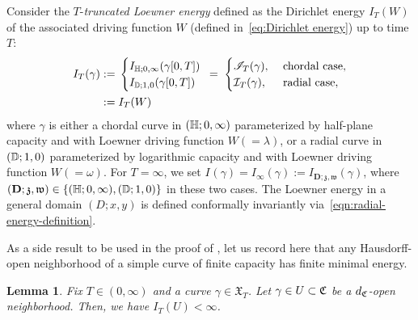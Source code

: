 \documentclass[a4paper, 11pt]{article}
\newtheorem{lem}[thm]{Lemma}
\theoremstyle{definition}
\numberwithin{equation}{section}
\numberwithin{figure}{section}
\newcommand{\BMenergy}[1][]{I_{#1}}%
\newcommand{\renergy}[1][]{{\mathcal I}_{#1}}
\newcommand{\cenergy}[1][]{{\mathscr I}_{#1}}
\newcommand{\lenergy}[2]{I_{#1;#2}}
\newcommand{\Xlenergy}[1][]{I_{#1}}
\newcommand{\Xpaths}[1][]{\mathfrak{X}_{#1}}
\newcommand{\dCcompsets}{d_{\Ccompsets}}
\newcommand{\Ddomain}{\mathbf{D}}
\newcommand{\targetpoint}{\mathfrak{w}}
\newcommand{\beginpoint}{\mathfrak{z}}
\begin{document}
Consider the $T$-\emph{truncated Loewner energy}  
defined as the Dirichlet energy $\BMenergy[T](W)$ of the associated driving function $W$
(defined in~\eqref{eq:Dirichlet energy}) up to time $T$: 
\begin{align}\label{eqn:truncated-energy-definition}
\begin{split}
\Xlenergy[T](\gamma) 
:= \; & 
\begin{cases}
\lenergy{\bH}{0, \infty}(\gamma[0,T]) \\
\lenergy{\bD}{1, 0}(\gamma[0,T])
\end{cases}
\hspace*{-2mm} = \; 
\begin{cases}
\cenergy[T](\gamma) , & \textnormal{ chordal case},\\
\renergy[T](\gamma) , & \textnormal{ radial case},
\end{cases}
\\ := \; & 
\BMenergy[T](W) 
\end{split}
\end{align}
where $\gamma$ is either a chordal curve in $(\mathbb{H}; 0, \infty)$ parameterized by half-plane capacity and with Loewner driving function $W( = \lambda)$, 
or a radial curve in $(\mathbb{D} ;1, 0)$
parameterized by logarithmic capacity and with Loewner driving function $W( = \omega)$. 
For $T= \infty$, we set $\Xlenergy[](\gamma) = \Xlenergy[\infty](\gamma) := \lenergy{\Ddomain}{\beginpoint,\targetpoint}(\gamma)$, 
where $(\Ddomain;\beginpoint,\targetpoint) \in \{ (\bH;0,\infty), (\bD;1,0) \}$ in these two cases.
The Loewner energy in a general domain $(D;x,y)$ is defined conformally invariantly via~\eqref{eqn:radial-energy-definition}.


As a side result to be used in the proof of , 
let us record here that any Hausdorff-open neighborhood of 
a simple curve of finite capacity has finite minimal energy.

\begin{lem}\label{thm:open-sets-have-finite-energy}
Fix $T \in (0,\infty)$ and a curve $\gamma \in \Xpaths[T]$.
Let $\gamma \in U \subset \mathfrak{C}$ be a $\dCcompsets$-open neighborhood. 
Then, we have $\Xlenergy[T](U) < \infty$.
\end{lem}
\end{document}
